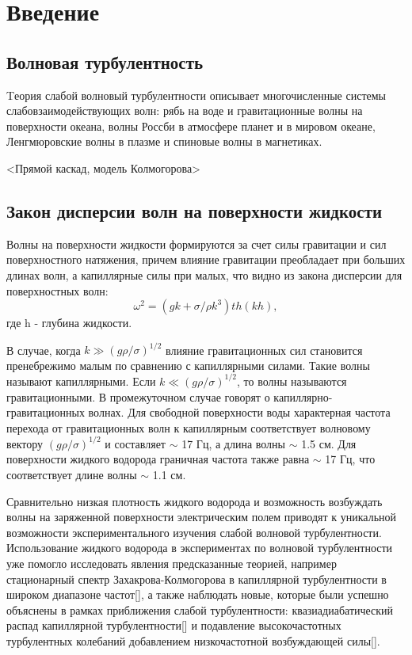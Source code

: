 \chapter{Введение}\label{chapt1}
\section{Волновая турбулентность}%
Tеория слабой волновый турбулентности описывает многочисленные системы слабовзаимодействующих волн: рябь на воде и гравитационные волны на поверхности океана, волны Россби в атмосфере планет и в мировом океане, Ленгмюровские волны в плазме и спиновые волны в магнетиках.

<Прямой каскад, модель Колмогорова>
\section{Закон дисперсии волн на поверхности жидкости}%

Волны на поверхности жидкости формируются за счет силы гравитации и сил поверхностного натяжения, причем влияние гравитации преобладает при больших длинах волн, а капиллярные силы при малых, что видно из закона дисперсии для поверхностных волн: 
\begin{equation}
 \label{eq:disper}
\omega^2 = (gk + \sigma/\rho k^3)th(kh),
\end{equation}
где h - глубина жидкости.

В случае, когда $k \gg (g\rho/\sigma)^{1/2}$ влияние гравитационных сил становится пренебрежимо малым по сравнению 
с капиллярными силами. Такие волны называют капиллярными. Если $k \ll (g\rho/\sigma)^{1/2}$, то волны называются гравитационными. В промежуточном случае говорят о капиллярно-гравитационных волнах. Для свободной поверхности воды характерная частота перехода от гравитационных волн к капиллярным соответствует волновому вектору $(g\rho/\sigma)^{1/2}$ и составляет $\sim$ 17 Гц, а длина волны $\sim$ 1.5 см. Для поверхности жидкого водорода граничная частота также равна $\sim$ 17 Гц, что соответствует длине волны $\sim$ 1.1 см.

Сравнительно низкая плотность жидкого водорода и возможность возбуждать волны на заряженной поверхности электрическим полем приводят к уникальной возможности экспериментального изучения слабой волновой турбулентности. Использование жидкого водорода в экспериментах по волновой турбулентности уже помогло исследовать явления предсказанные теорией, например стационарный  спектр Захакрова-Колмогорова в капиллярной турбулентности в широком диапазоне частот[], а также наблюдать новые, которые были успешно объяснены в рамках  приближения слабой турбулентности: квазиадиабатический распад капиллярной турбулентности[] и подавление высокочастотных турбулентных колебаний добавлением низкочастотной возбуждающей силы[].


